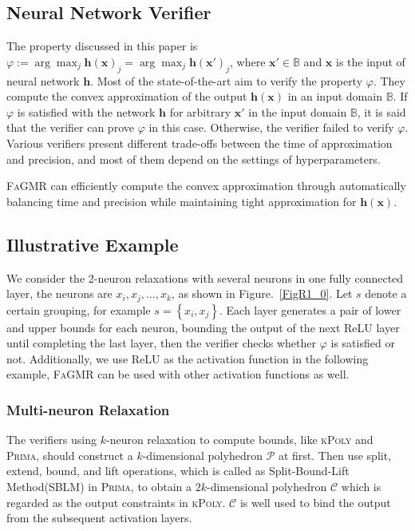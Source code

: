 \documentclass[runningheads]{llncs}
\newcommand{\ourtool}{\textsc{FaGMR}\xspace}
\newcommand{\prima}{\textsc{Prima}\xspace}
\newcommand{\krelu}{\textsc{kPoly}\xspace}
\newcommand{\myvec}[1]{\boldsymbol{#1}}
\newcommand{\relu}{ReLU\xspace}
\begin{document}
\subsection{Neural Network Verifier}
The property discussed in this paper is $\varphi := \arg \max_{j} \myvec{h}(\myvec{x})_{j} = \arg \max_{j}
\myvec{h}(\myvec{x}')_{j}$, where $\myvec{x}' \in \mathbb{B}$ and $\myvec{x}$ is the input of neural network $\myvec{h}$. Most of the state-of-the-art aim to verify the property $\varphi$. They compute the convex approximation of the output $\myvec{h}(\myvec{x})$ in an input domain $\mathbb{B}$. If $\varphi$ is satisfied with the network $\myvec{h}$ for arbitrary $\myvec{x}'$ in the input domain $\mathbb{B}$, it is said that the verifier can prove $\varphi$ in this case. Otherwise, the verifier failed to verify $\varphi$. Various verifiers present different trade-offs between the time of approximation and precision, and most of them depend on the settings of hyperparameters.

\ourtool can efficiently compute the convex approximation through automatically balancing time and precision while maintaining tight approximation for $\myvec{h}(\myvec{x})$.

%
%
%
\subsection{Illustrative Example}\label{illustrative example}
We consider the 2-neuron relaxations with several neurons in one fully connected layer, the neurons are $x_{i},x_{j},...,x_{k}$, as shown in  Figure.~\ref{FigR1_0}. Let $s$ denote a certain grouping, for example $s = \left\{x_{i},x_{j}\right\}$. Each layer generates a pair of lower and upper bounds for each neuron, bounding the output of the next \relu layer until completing the last layer, then the verifier checks whether $\varphi$ is satisfied or not. Additionally, we use \relu as the activation function in the  following example, \ourtool can be used with other activation functions as well. 
%
%
%
\subsubsection{Multi-neuron Relaxation}
The verifiers using $k$-neuron relaxation to compute bounds, like \krelu and \prima, should construct a $k$-dimensional polyhedron $\mathcal{P}$ at first. Then use split, extend, bound, and lift operations, which is called as Split-Bound-Lift Method(SBLM) in \prima, to obtain a $2k$-dimensional polyhedron $\mathcal{C}$ which is regarded as the output constraints in \krelu. $\mathcal{C}$ is well used to bind the output from the subsequent activation layers.
\end{document}
